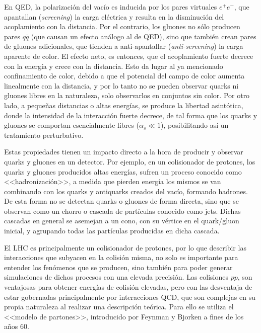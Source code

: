 En QED, la polarización del vacío es inducida por los
pares virtuales $e^{+}e^{-}$, que apantallan (\textit{screening}) la carga eléctrica y resulta en la disminución del
acoplamiento con la distancia. Por el contrario, los gluones no sólo producen pares $q\bar{q}$ (que causan un efecto análogo al de QED), sino que también crean pares de gluones adicionales,
que tienden a anti-apantallar (\textit{anti-screening}) la carga aparente de color. El efecto neto, es entonces, que el acoplamiento fuerte decrece con la energía y crece con la distancia. Esto da lugar al ya mencionado confinamiento de color, debido a que el potencial del campo de color aumenta linealmente con la distancia, y por lo tanto no se pueden observar quarks ni gluones libres en la naturaleza, solo observarlos en conjuntos sin color. Por otro lado, a pequeñas distancias o altas energías, se produce la libertad asintótica, donde la intensidad de
la interacción fuerte decrece, de tal forma que los quarks y gluones se comportan
esencialmente libres ($\alpha_s \ll 1$), posibilitando así un tratamiento perturbativo. 

Estas propiedades tienen un impacto directo a la hora de producir y observar quarks y gluones en un detector. Por ejemplo, en un colisionador de protones, los quarks y
gluones producidos altas energías, sufren un proceso conocido como <<hadronización>>,
a medida que pierden energía los mismos se van combinando con los quarks y antiquarks creados del vacío, formando hadrones. De esta forma no se detectan quarks o gluones de forma directa, sino que se observan como un chorro o cascada de partículas conocido como jets. Dichas cascadas en general se asemejan a un cono, con su vértice en el quark/gluon inicial, y agrupando todas las partículas producidas en dicha cascada. 




El LHC es principalmente un colisionador de protones, por lo que describir las interacciones que subyacen en la colisión misma, no solo es importante para entender los fenómenos que se producen, sino también para poder generar simulaciones de dichos procesos con una elevada precisión. Las colisiones $pp$, son ventajosas para obtener energías de colisión elevadas, pero con las desventaja de estar gobernadas principalmente por interacciones QCD, que son complejas en su propia naturaleza al realizar una descripción teórica. Para ello se utiliza el <<modelo de partones>>, introducido por Feynman \cite{PhysRevLett.23.1415} y Bjorken \cite{PhysRev.185.1975} a fines de los años 60. 

